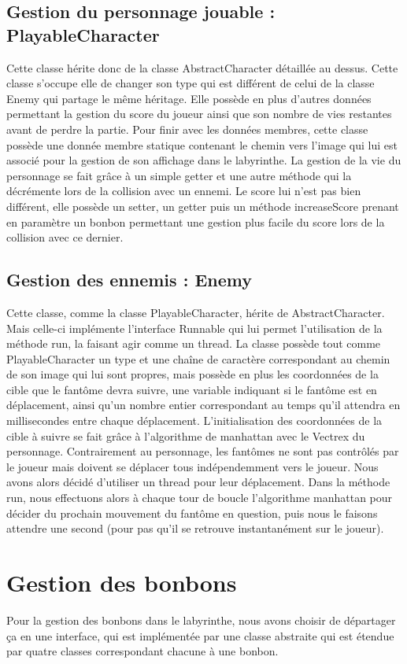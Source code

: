 \documentclass [10pt, a4paper]{article}
\begin{document}
\subsection {Gestion du personnage jouable : PlayableCharacter}
Cette classe hérite donc de la classe AbstractCharacter détaillée au dessus. Cette classe s'occupe elle de changer son type qui est différent de celui de la classe Enemy qui partage le même héritage. Elle possède en plus d'autres données permettant la gestion du score du joueur ainsi que son nombre de vies restantes avant de perdre la partie. Pour finir avec les données membres, cette classe possède une donnée membre statique contenant le chemin vers l'image qui lui est associé pour la gestion de son affichage dans le labyrinthe. La gestion de la vie du personnage se fait grâce à un simple getter et une autre méthode qui la décrémente lors de la collision avec un ennemi. Le score lui n'est pas bien différent, elle possède un setter, un getter puis un méthode increaseScore prenant en paramètre un bonbon permettant une gestion plus facile du score lors de la collision avec ce dernier.

\subsection {Gestion des ennemis : Enemy}
Cette classe, comme la classe PlayableCharacter, hérite de AbstractCharacter. Mais celle-ci implémente l'interface Runnable qui lui permet l'utilisation de la méthode run, la faisant agir comme un thread. La classe possède tout comme PlayableCharacter un type et une chaîne de caractère correspondant au chemin de son image qui lui sont propres, mais possède en plus les coordonnées de la cible que le fantôme devra suivre, une variable indiquant si le fantôme est en déplacement, ainsi qu'un nombre entier correspondant au temps qu'il attendra en millisecondes entre chaque déplacement. L'initialisation des coordonnées de la cible à suivre se fait grâce à l'algorithme de manhattan avec le Vectrex du personnage. Contrairement au personnage, les fantômes ne sont pas contrôlés par le joueur mais doivent se déplacer tous indépendemment vers le joueur. Nous avons alors décidé d'utiliser un thread pour leur déplacement. Dans la méthode run, nous effectuons alors à chaque tour de boucle l'algorithme manhattan pour décider du prochain mouvement du fantôme en question, puis nous le faisons attendre une second (pour pas qu'il se retrouve instantanément sur le joueur).

\section {Gestion des bonbons}
Pour la gestion des bonbons dans le labyrinthe, nous avons choisir de départager ça en une interface, qui est implémentée par une classe abstraite qui est étendue par quatre classes correspondant chacune à une bonbon.
\end{document}
